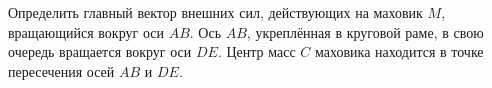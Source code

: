 Определить главный вектор внешних сил, действующих на маховик $M$,
вращающийся вокруг оси $AB$.
Ось $AB$, укреплённая в круговой раме, в свою очередь вращается вокруг оси $DE$.
Центр масс $C$ маховика находится в точке пересечения осей $AB$ и $DE$.
